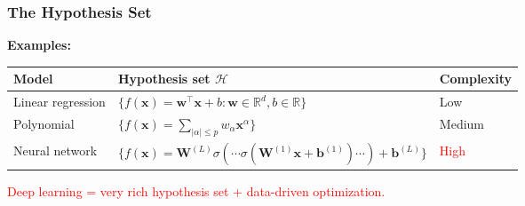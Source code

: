 \documentclass[notes,11pt, aspectratio=169]{beamer}
\newcommand{\vx}{\mathbf{x}}
\newcommand{\vw}{\mathbf{w}}
\newcommand{\vb}{\mathbf{b}}
\newcommand{\vW}{\mathbf{W}}
\newcommand{\R}{\mathbb{R}}
\begin{document}
\begin{frame}
\frametitle{The Hypothesis Set}


\vspace{8pt}
\textbf{Examples:}

\renewcommand{\arraystretch}{1.5}
\begin{center}
\begin{tabular}{lll}
\toprule
\textbf{Model} & \textbf{Hypothesis set $\mathcal{H}$} & \textbf{Complexity} \\
\midrule
Linear regression & $\{f(\vx) = \vw^\top \vx + b : \vw \in \R^d, b \in \R\}$ & Low \\
Polynomial & $\{f(\vx) = \sum_{|\alpha| \leq p} w_\alpha \vx^\alpha\}$ & Medium \\
Neural network & $\{f(\vx) = \vW^{(L)}\sigma(\cdots\sigma(\vW^{(1)}\vx + \vb^{(1)})\cdots) + \vb^{(L)}\}$ & \textcolor{red}{High} \\
\bottomrule
\end{tabular}
\end{center}

\vspace{10pt}
\begin{center}
\textcolor{red}{Deep learning = very rich hypothesis set + data-driven optimization.}
\end{center}
\end{frame}
\end{document}
